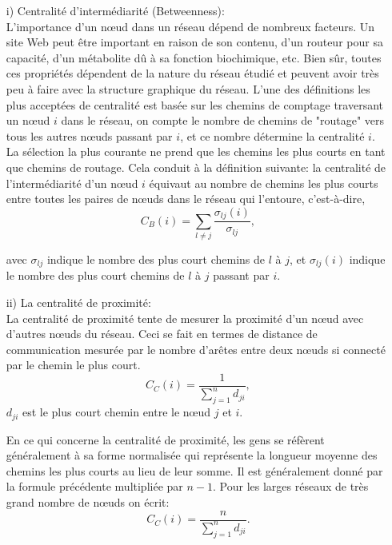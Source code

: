\begin{itemize}
 \item[i)] Centralité d'intermédiarité (Betweenness):\\
  L'importance d'un nœud dans un réseau dépend de nombreux facteurs. Un site Web peut être important en raison de son contenu, d'un routeur pour sa capacité, d'un métabolite dû à sa fonction biochimique, etc. Bien sûr, toutes ces propriétés dépendent de la nature du réseau étudié et peuvent avoir très peu à faire avec la structure graphique du réseau. L'une des définitions les plus acceptées de centralité est basée sur les chemins de comptage traversant un nœud $i$ dans le réseau, on compte le nombre de chemins de "routage" vers tous les autres nœuds passant par $i$, et ce nombre détermine la centralité $i$. La sélection la plus courante ne prend que les chemins les plus courts en tant que chemins de routage. Cela conduit à la définition suivante: la centralité de l'intermédiarité d'un nœud $i$ équivaut au nombre de chemins les plus courts entre toutes les paires de nœuds dans le réseau qui l'entoure, c'est-à-dire,
 \begin{equation}
 C_B(i)=\sum_{l\neq j}\dfrac{\sigma_{lj}(i)}{\sigma_{lj}},
 \end{equation}
 
 avec $\sigma_{lj}$ indique le nombre des plus court chemins de $l$ à $j$, et $\sigma_{lj}(i)$ indique le nombre des plus court chemins de $l$ à $j$ passant par $i$.
 
\item[ii)] La centralité de proximité:\\
La centralité de proximité tente de mesurer la proximité d'un nœud avec d'autres nœuds du réseau. Ceci se fait en termes de distance de communication mesurée par le nombre d'arêtes entre deux nœuds si connecté par le chemin le plus court.
\begin{equation}
C_C(i)=\dfrac{1}{\sum_{j=1}^nd_{ji}},
\end{equation}
$d_{ji}$ est le plus court chemin entre le nœud $j$ et $i$.

En ce qui concerne la centralité de proximité, les gens se réfèrent généralement à sa forme normalisée qui représente la longueur moyenne des chemins les plus courts au lieu de leur somme. Il est généralement donné par la formule précédente multipliée par $n-1$. Pour les larges réseaux de très grand nombre de nœuds on écrit:
\begin{equation}
C_C(i)=\dfrac{n}{\sum_{j=1}^nd_{ji}}.
\end{equation}
\end{itemize}

